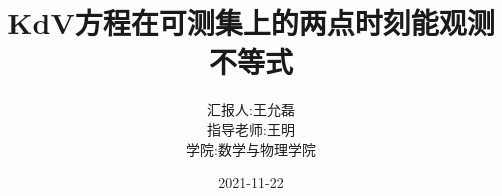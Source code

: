 \documentclass[aspectratio=169,xcolor=svgnames,serif,table,11pt]{beamer}
\title{KdV方程在可测集上的两点时刻能观测不等式}
\institute[CUG]{\texttt{[image: cug.jpeg]}}
\author[王允磊]
{汇报人:王允磊\\
  指导老师:王明\\
学院:数学与物理学院}
\date{\tiny 2021-11-22}
\begin{document}
\setlength{\abovedisplayskip}{1ex}%
\setlength{\belowdisplayskip}{1ex}%


\begin{frame}
  \titlepage
\end{frame}




\end{document}
